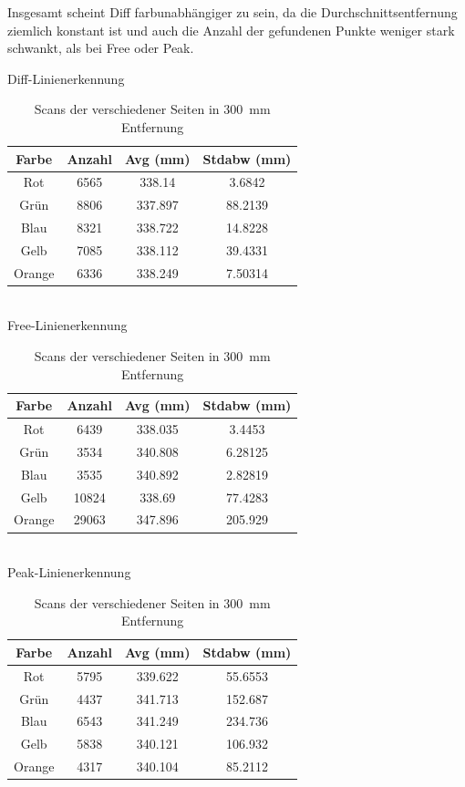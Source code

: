\documentclass[ngerman,a4paper,parskip=half]{scrartcl}
\begin{document}
Insgesamt scheint Diff farbunabhängiger zu sein, da die Durchschnittsentfernung ziemlich konstant ist und auch die Anzahl der gefundenen Punkte weniger stark schwankt, als bei Free oder Peak. 


\begin{table}[H]
	\centering
	Diff-Linienerkennung \\
	\begin{tabular}{c|c|c|c}
		Farbe & Anzahl & Avg (mm) & Stdabw (mm) \\ \hline
		Rot & 6565 & 338.14 & 3.6842 \\
		Grün & 8806 & 337.897 & 88.2139 \\
		Blau & 8321 & 338.722 & 14.8228 \\
		Gelb & 7085 & 338.112 & 39.4331 \\
		Orange & 6336 & 338.249 & 7.50314 \\
	\end{tabular} \\
	\vspace{1em}
	Free-Linienerkennung \\
		\begin{tabular}{c|c|c|c}
		Farbe & Anzahl & Avg (mm) & Stdabw (mm) \\ \hline
		Rot & 6439 & 338.035 & 3.4453 \\
		Grün & 3534 & 340.808 & 6.28125 \\
		Blau & 3535 & 340.892 & 2.82819 \\
		Gelb & 10824 & 338.69 & 77.4283 \\
		Orange & 29063 & 347.896 & 205.929 \\
	\end{tabular} \\
	\vspace{1em}
	Peak-Linienerkennung \\
		\begin{tabular}{c|c|c|c}
		Farbe & Anzahl & Avg (mm) & Stdabw (mm) \\ \hline
		Rot & 5795 & 339.622 & 55.6553 \\
		Grün & 4437 & 341.713 & 152.687 \\
		Blau & 6543 & 341.249 & 234.736 \\
		Gelb & 5838 & 340.121 & 106.932 \\
		Orange & 4317 & 340.104 & 85.2112 \\
	\end{tabular} \
	\caption{Scans der verschiedener Seiten in 300~mm Entfernung}
	\label{tab:colors}
\end{table}
\end{document}
